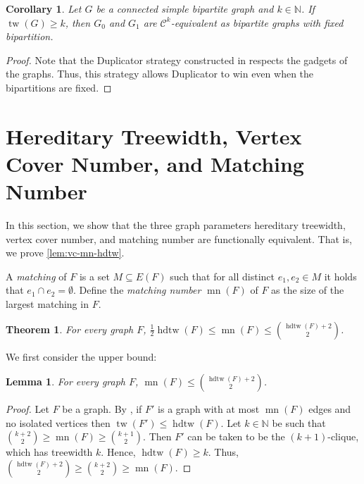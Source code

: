 \documentclass[10pt,a4paper]{article}
\theoremstyle{definition}
\theoremstyle{plain}
\newtheorem{lemma}[definition]{Lemma}
\newtheorem{corollary}[definition]{Corollary}
\newtheorem{theorem}[definition]{Theorem}
\theoremstyle{remark}
\DeclareMathOperator{\tw}{tw}
\DeclareMathOperator{\hdtw}{hdtw}
\DeclareMathOperator{\mn}{mn}
\begin{document}
	\begin{corollary}\label{thm:neuen-bipartite}
		Let $G$ be a connected simple bipartite graph and $k \in \mathbb{N}$.
		If $\tw(G) \geq k$, then $G_0$ and $G_1$ are $\mathcal{C}^k$-equivalent as bipartite graphs with fixed bipartition.
	\end{corollary}
	\begin{proof}
		Note that the Duplicator strategy constructed in \cite[Lemmas~11 and~12]{neuen_homomorphism-distinguishing_2024} respects the gadgets of the  graphs.
		Thus, this strategy allows Duplicator to win even when the bipartitions are fixed.
	\end{proof}
	
	
	
	
	\section{Hereditary Treewidth, Vertex Cover Number, and Matching Number}
	\label{sec:hdtw}
	In this section, we show that the three graph parameters hereditary treewidth, vertex cover number, and matching number are functionally equivalent.
	That is, we prove \cref{lem:vc-mn-hdtw}.
	
	
	A \emph{matching} of $F$ is a set $M \subseteq E(F)$ such that for all distinct $e_1, e_2 \in M$ it holds that $e_1 \cap e_2 = \emptyset$.
	Define the \emph{matching number} $\mn(F)$ of $F$ as the size of the largest matching in $F$.
	\begin{theorem} \label{thm:mn-hdtw}
		For every graph $F$,
		$\frac12 \hdtw(F) \leq \mn(F) \leq \binom{\hdtw(F) + 2}{2}$.
	\end{theorem}
	
	We first consider the upper bound:
	
	\begin{lemma}
		For every graph $F$,
		$\mn(F) \leq \binom{\hdtw(F)+2}{2}$.
	\end{lemma}
	\begin{proof}
		Let $F$ be a graph.
		By \cite[Fact~3.4]{curticapean_homomorphisms_2017},
		if $F'$ is a graph with at most $\mn( F)$ edges and no isolated vertices then $\tw(F') \leq \hdtw(F)$.
		Let $k \in \mathbb{N}$ be such that $\binom{k+2}{2} \geq \mn(F) \geq \binom{k+1}{2}$.
		Then $F'$ can be taken to be the $(k+1)$-clique, which has treewidth $k$.
		Hence, $\hdtw(F) \geq k$.
		Thus, $\binom{\hdtw(F) +2}{2} \geq \binom{k+2}{2} \geq \mn(F)$.
	\end{proof}
	
\end{document}
